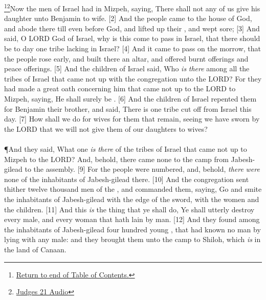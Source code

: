 \footnote{\textcolor[cmyk]{0.99998,1,0,0}{\hyperlink{TOC}{Return to end of Table of Contents.}}}\footnote{\href{https://audiobible.com/bible/judges_21.html}{\textcolor[cmyk]{0.99998,1,0,0}{Judges 21 Audio}}}\textcolor[cmyk]{0.99998,1,0,0}{Now the men of Israel had  in Mizpeh, saying, There shall not any of us give his daughter unto Benjamin to wife.}
[2] \textcolor[cmyk]{0.99998,1,0,0}{And the people came to the house of God, and abode there till even before God, and lifted up their , and wept sore;}
[3] \textcolor[cmyk]{0.99998,1,0,0}{And said, O LORD God of Israel, why is this come to pass in Israel, that there should be to day one tribe lacking in Israel?}
[4] \textcolor[cmyk]{0.99998,1,0,0}{And it came to pass on the morrow, that the people rose early, and built there an altar, and offered burnt offerings and peace offerings.}
[5] \textcolor[cmyk]{0.99998,1,0,0}{And the children of Israel said, Who \emph{is} \emph{there} among all the tribes of Israel that came not up with the congregation unto the LORD? For they had made a great oath concerning him that came not up to the LORD to Mizpeh, saying, He shall surely be .}
[6] \textcolor[cmyk]{0.99998,1,0,0}{And the children of Israel repented them for Benjamin their brother, and said, There is one tribe cut off from Israel this day.}
[7] \textcolor[cmyk]{0.99998,1,0,0}{How shall we do for wives for them that remain, seeing we have sworn by the LORD that we will not give them of our daughters to wives?}\\
\\
\P \textcolor[cmyk]{0.99998,1,0,0}{And they said, What one \emph{is} \emph{there} of the tribes of Israel that came not up to Mizpeh to the LORD? And, behold, there came none to the camp from Jabesh-gilead to the assembly.}
[9] \textcolor[cmyk]{0.99998,1,0,0}{For the people were numbered, and, behold, \emph{there} \emph{were} none of the inhabitants of Jabesh-gilead there.}
[10] \textcolor[cmyk]{0.99998,1,0,0}{And the congregation sent thither twelve thousand men of the , and commanded them, saying, Go and smite the inhabitants of Jabesh-gilead with the edge of the sword, with the women and the children.}
[11] \textcolor[cmyk]{0.99998,1,0,0}{And this \emph{is} the thing that ye shall do, Ye shall utterly destroy every male, and every woman that hath lain by man.}
[12] \textcolor[cmyk]{0.99998,1,0,0}{And they found among the inhabitants of Jabesh-gilead four hundred young , that had known no man by lying with any male: and they brought them unto the camp to Shiloh, which \emph{is} in the land of Canaan.}
